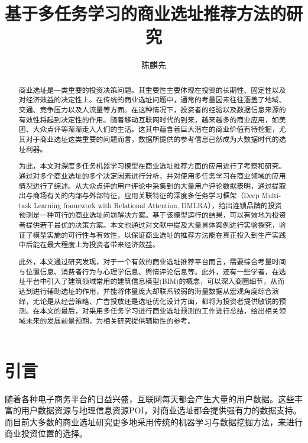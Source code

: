 \documentclass[UTF8]{llncs}
\begin{document}
	
\title{基于多任务学习的商业选址推荐方法的研究}
\author{陈麒先}
\maketitle

\begin{abstract}
商业选址是一类重要的投资决策问题。其重要性主要体现在投资的长期性、固定性以及对经济效益的决定性上。在传统的商业选址问题中，通常的考量因素往往涵盖了地域、交通、竞争压力以及人流量等方面。在这种情况下，投资者的经验以及数据信息来源的有效性将起到决定性的作用。随着移动互联网时代的到来，越来越多的商业应用，如美团、大众点评等渐渐走入人们的生活。这其中蕴含着巨大潜在的商业价值有待挖掘，尤其对于商业选址这类重要的问题而言，数据所提供的参考信息已然成为大数据时代的选址利器。

为此，本文对深度多任务机器学习模型在商业选址推荐方面的应用进行了考察和研究。通过对多个商业选址的多个决定因素进行分析，并对使用多任务学习在商业领域的应用情况进行了综述。从大众点评的用户评论中采集到的大量用户评论数据表明，通过提取出与商场有关的内部与外部特征，应用关联特征的深度多任务学习框架（Deep Multi-task Learning framework with Relational Attention, DMLRA），给出连锁品牌的投资预测是一种可行的商业选址问题解决方案。基于该模型运行的结果，可以有效地为投资者提供若干最优的决策方案。本文也通过对文献中提及大量具体案例进行实验探究，验证了模型实施的可行性与有效性，以保证商业选址的推荐方法能在真正投入到生产实践中后能在最大程度上为投资者带来经济效益。

此外，本文通过研究发现，对于一个有效的商业选址推荐平台而言，需要综合考量时间与位置信息、消费者行为与心理学信息、舆情评论信息等。此外，还有一些学者，在选址平台中引入了建筑领域常用的建筑信息模型(BIM)的概念，可以深入商圈细节，从而达到进行辅助选址的作用，并能将体量庞大却联系较弱的海量数据从宏观角度综合演绎，无论是从经营策略、广告投放还是选址优化设计方面，都将为投资者提供敏锐的预测。在本文的最后，对采用多任务学习进行商业选址预测的工作进行总结，给出相关领域未来的发展前景预期，为相关研究提供辅助性的参考。

\end{abstract}

\section{引言}
随着各种电子商务平台的日益兴盛，互联网每天都会产生大量的用户数据。这些丰富的用户数据资源与地理信息资源POI，对商业选址都会提供强有力的数据支持。而目前大多数的商业选址研究更多地采用传统的机器学习与数据挖掘方法，来进行商业投资位置的选择。
\end{document}
